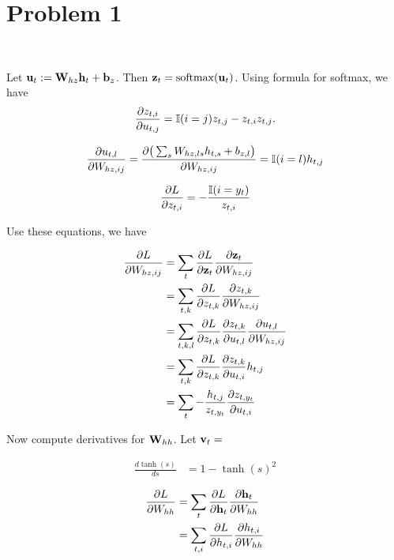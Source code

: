 \section{Problem 1}~\label{sec:prob1}

Let ${\mathbf{u}}_t:={\mathbf{W}}_{hz}{\mathbf{h}}_t+{\mathbf{b}}_z$.
Then ${\mathbf{z}}_t={\mathop{\mathrm{softmax}}}({\mathbf{u}}_t)$.
Using formula for softmax, we have
\begin{equation}
    \frac{\partial z_{t,i}}{\partial u_{t,j}} = {\mathbb{I}}(i=j)z_{t,j}-z_{t,i}z_{t,j}.
\end{equation}

\begin{equation}
    \frac{\partial u_{t,l}}{\partial W_{hz,ij}}
        = \frac{\partial \big(\sum_s W_{hz,ls}h_{t,s}+b_{z,l}\big)}{\partial W_{hz,ij}}
        = {\mathbb{I}}(i=l)h_{t,j}
\end{equation}

\begin{equation}
    \frac{\partial L}{\partial z_{t,i}}= -\frac{{\mathbb{I}}(i=y_t)}{z_{t,i}}
\end{equation}

Use these equations, we have

\begin{equation}
\begin{split}
    \frac{\partial L}{\partial W_{hz,ij}}
        &= \sum_t \frac{\partial L}{\partial {\mathbf{z}}_t} \frac{\partial {\mathbf{z}}_t}{\partial W_{hz,ij}} \\
        &= \sum_{t,k} \frac{\partial L}{\partial z_{t,k}} \frac{\partial z_{t,k}}{\partial W_{hz,ij}} \\
        &= \sum_{t,k,l} \frac{\partial L}{\partial z_{t,k}} \frac{\partial z_{t,k}}{\partial u_{t,l}}\frac{\partial u_{t,l}}{\partial W_{hz,ij}} \\
        &= \sum_{t,k} \frac{\partial L}{\partial z_{t,k}} \frac{\partial z_{t,k}}{\partial u_{t,i}}h_{t,j} \\
        &= \sum_{t} -\frac{h_{t,j}}{z_{t,y_t}} \frac{\partial z_{t,{y_t}}}{\partial u_{t,i}} \\
\end{split}
\end{equation}

Now compute derivatives for ${\mathbf{W}}_{hh}$.
Let ${\mathbf{v}}_t=$

\begin{equation}
\begin{split}
    \frac{d \tanh(s)}{d s}
        &= 1 - \tanh(s)^2
\end{split}
\end{equation}

\begin{equation}
\begin{split}
    \frac{\partial L}{\partial W_{hh}}
        &= \sum_t \frac{\partial L}{\partial {\mathbf{h}}_t} \frac{\partial {\mathbf{h}}_t}{\partial W_{hh}} \\
        &= \sum_{t,i} \frac{\partial L}{\partial h_{t,i}} \frac{\partial h_{t,i}}{\partial W_{hh}} \\
\end{split}
\end{equation}
